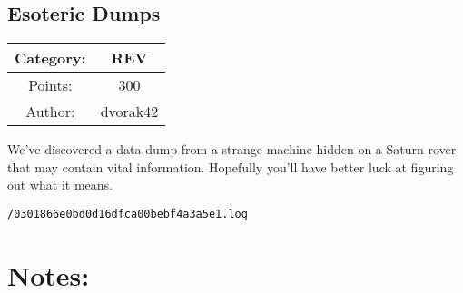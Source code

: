 \begin{center}
\section*{Esoteric Dumps}
{\large
\begin{tabular}{| c c |}
\hline
Category: & REV\\\hline
Points: & 300\\\hline
Author: & dvorak42\\\hline
\end{tabular}
}
\end{center}
\vspace{0.5in}

{\large
We've discovered a data dump from a strange machine hidden on a Saturn rover that may contain vital information. Hopefully you'll have better luck at figuring out what it means.
}
\vspace{0.25in}
\begin{center}
  {\Large\tt /0301866e0bd0d16dfca00bebf4a3a5e1.log}
\end{center}

\vspace{0.25in}
\section*{Notes:}
